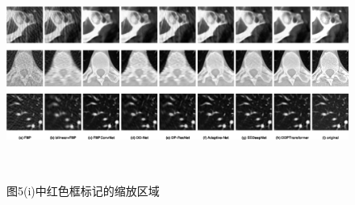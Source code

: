 \begin{figure}
	\centering
	\includegraphics[height=7cm,width=18cm]{15.eps}
	\caption{图5(i)中红色框标记的缩放区域}
	\label{fig8}
\end{figure}
